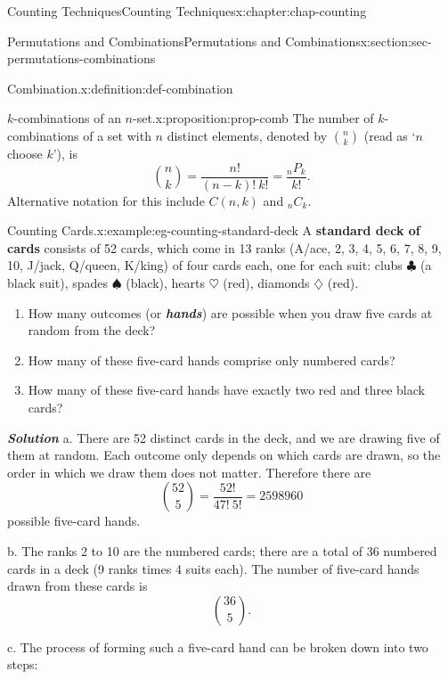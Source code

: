 \documentclass[oneside,10pt,]{book}
\newcommand{\alert}[1]{\textbf{\textit{#1}}}
\newcommand{\terminology}[1]{\textbf{#1}}
\numberwithin{equation}{section}
\begin{document}
\begin{chapterptx}{Counting Techniques}{}{Counting Techniques}{}{}{x:chapter:chap-counting}
\begin{sectionptx}{Permutations and Combinations}{}{Permutations and Combinations}{}{}{x:section:sec-permutations-combinations}
\begin{definition}{Combination.}{x:definition:def-combination}
\end{definition}
\begin{proposition}{\(k\)-combinations of an \(n\)-set.}{}{x:proposition:prop-comb}%
The number of \(k\)-combinations of a set with \(n\) distinct elements, denoted by \(\displaystyle\binom{n}{k}\) (read as `\(n\) choose \(k\)'), is%
\begin{equation*}
\binom{n}{k} = \dfrac{n!}{(n-k)!\ k!} = \dfrac{{}_nP_k}{k!}\text{.}
\end{equation*}
Alternative notation for this include \(C(n,k)\) and \(_nC_k\).%
\end{proposition}
\begin{example}{Counting Cards.}{x:example:eg-counting-standard-deck}%
A \terminology{standard deck of cards} consists of 52 cards, which come in 13 ranks (A\slash{}ace, 2, 3, 4, 5, 6, 7, 8, 9, 10, J\slash{}jack, Q\slash{}queen, K\slash{}king) of four cards each, one for each suit: clubs \(\clubsuit\) (a black suit), spades \(\spadesuit\) (black), hearts \(\heartsuit\) (red), diamonds \(\diamondsuit\) (red).%
\begin{enumerate}[label=(\alph*)]
\item{}How many outcomes (or \alert{hands}) are possible when you draw five cards at random from the deck?%
\item{}How many of these five-card hands comprise only numbered cards?%
\item{}How many of these five-card hands have exactly two red and three black cards?%
\end{enumerate}
%
\par
\alert{Solution} a. There are 52 distinct cards in the deck, and we are drawing five of them at random. Each outcome only depends on which cards are drawn, so the order in which we draw them does not matter. Therefore there are%
\begin{equation*}
\binom{52}{5} = \frac{52!}{47! \ 5!} = 2598960
\end{equation*}
possible five-card hands.%
\par
b. The ranks 2 to 10 are the numbered cards; there are a total of 36 numbered cards in a deck (9 ranks times 4 suits each). The number of five-card hands drawn from these cards is%
\begin{equation*}
\binom{36}{5}\text{.}
\end{equation*}
%
\par
c. The process of forming such a five-card hand can be broken down into two steps:%
\begin{sidebyside}{2}{0.05}{0.05}{0.1}%

\end{sidebyside}
\end{example}
\end{sectionptx}
\end{chapterptx}
\end{document}
